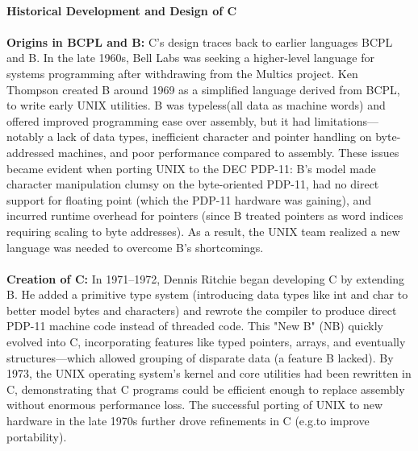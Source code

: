 \documentclass{article}
\begin{document}
\\
{\large \textbf{Historical Development and Design of C}}\\
\\
{\normalsize \textbf{Origins in BCPL and B}}{\normalsize \textbf{:}} {\normalsize C's design traces back to earlier languages BCPL and B. In the late 1960s, Bell Labs was seeking a higher-level language for systems programming after withdrawing from the Multi}{\normalsize cs project. Ken Thompson created B around 1969 as a simplified language derived from BCPL, to write early UNIX utilities. B was }{\normalsize typeless}{\normalsize  (all data as machine words) and offered improved programming ease over assembly, but it had limitations—notably a lack }{\normalsize of data types, inefficient character and pointer handling on byte-addressed machines, and poor performance compared to assembly. These issues became evident when porting UNIX to the DEC PDP-11: B's model made character manipulation clumsy on the byte-orien}{\normalsize ted PDP-11, had no direct support for floating point (which the PDP-11 hardware was gaining), and incurred runtime overhead for pointers (since B treated pointers as word indices requiring scaling to byte addresses). As a result, the UNIX team realized a n}{\normalsize ew language was needed to overcome B's shortcomings.}\\
\\
{\normalsize \textbf{Creation of C}}{\normalsize \textbf{:}} {\normalsize In 1971–1972, Dennis Ritchie began developing C by extending B. He added a primitive type system (introducing data types like int and char to better model bytes and characters) and rewro}{\normalsize te the compiler to produce direct PDP-11 machine code instead of threaded code. This "New B" (NB) quickly evolved into C, incorporating features like typed pointers, arrays, and eventually structures—which allowed grouping of disparate data (a feature B la}{\normalsize cked). By 1973, the UNIX operating system's kernel and core utilities had been rewritten in C, demonstrating that C programs could be efficient enough to replace assembly without enormous performance loss. The successful porting of UNIX to new hardware in }{\normalsize the late 1970s further drove refinements in C (}{\normalsize e.g.}{\normalsize  to improve portability).}\\
\\
\end{document}
